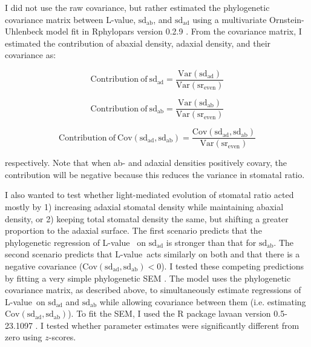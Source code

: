 \documentclass[12pt, oneside]{article}
\newcommand{\pkg}[1]{{\fontseries{b}\selectfont #1}}
\newcommand{\el}{L-value}
\begin{document}
I did not use the raw covariance, but rather estimated the phylogenetic covariance matrix between \el, $\mathrm{sd_{ab}}$, and $\mathrm{sd_{ad}}$ using a multivariate Ornstein-Uhlenbeck model fit in \pkg{Rphylopars} version 0.2.9 \citep{Goolsby_etal_2016, Goolsby_etal_2017}. From the covariance matrix, I estimated the contribution of abaxial density, adaxial density, and their covariance as:

\begin{equation} \label{eq:contribution_ad}
	\mathrm{Contribution~of~sd_{ad}} = \frac{\mathrm{Var(sd_{ad})}}{\mathrm{Var(sr_{even})}}
\end{equation}

\begin{equation} \label{eq:contribution_ab}
 \mathrm{Contribution~of~sd_{ab}} = \frac{\mathrm{Var(sd_{ab})}}{\mathrm{Var(sr_{even})}}
\end{equation}

\begin{equation} \label{eq:contribution_cov}
 \mathrm{Contribution~of~Cov(sd_{ad}, sd_{ab})} = \frac{\mathrm{Cov(sd_{ad}, sd_{ab})}}{\mathrm{Var(sr_{even})}}
\end{equation}

respectively. Note that when ab- and adaxial densities positively covary, the contribution will be negative because this reduces the variance in stomatal ratio.

I also wanted to test whether light-mediated evolution of stomatal ratio acted mostly by 1) increasing adaxial stomatal density while maintaining abaxial density, or 2) keeping total stomatal density the same, but shifting a greater proportion to the adaxial surface. The first scenario predicts that the phylogenetic regression of \el~ on $\mathrm{sd_{ad}}$ is stronger than that for $\mathrm{sd_{ab}}$. The second scenario predicts that \el~acts similarly on both and that there is a negative covariance ($\mathrm{Cov(sd_{ad}, sd_{ab}) < 0}$). I tested these competing predictions by fitting a very simple phylogenetic SEM \citep[see][for a similar approach]{Mason_etal_2016}. The model uses the phylogenetic covariance matrix, as described above, to simultaneously estimate regressions of \el~on $\mathrm{sd_{ad}}$ and $\mathrm{sd_{ab}}$ while allowing covariance between them (i.e. estimating $\mathrm{Cov(sd_{ad}, sd_{ab})}$). To fit the SEM, I used the R package \pkg{lavaan} version 0.5-23.1097 \citep{Rosseel_2012}. I tested whether parameter estimates were significantly different from zero using $z$-scores.
\end{document}
